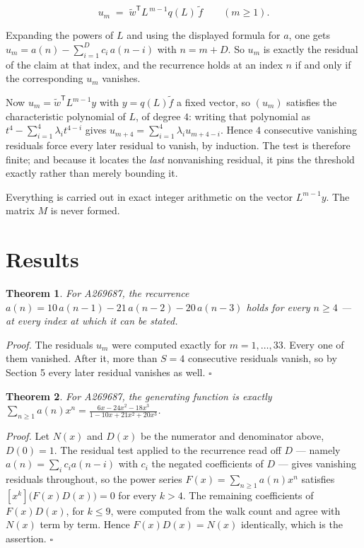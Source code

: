 \documentclass[11pt]{article}
\newtheorem{theorem}{Theorem}
\theoremstyle{definition}
\begin{document}
\[u_m \;=\; \tilde w^{\mathsf T} L^{\,m-1} q(L)\,\tilde f \qquad (m \ge 1).\]

Expanding the powers of $L$ and using the displayed formula for $a$, one gets $u_m = a(n) - \sum_{i=1}^{D} c_i\,a(n-i)$ with $n = m + D$. So $u_m$ is exactly the residual of the claim at that index, and the recurrence holds at an index $n$ if and only if the corresponding $u_m$ vanishes.

Now $u_m = \tilde w^{\mathsf T} L^{m-1} y$ with $y = q(L)\tilde f$ a fixed vector, so $(u_m)$ satisfies the characteristic polynomial of $L$, of degree $4$: writing that polynomial as $t^{4} - \sum_{i=1}^{4} \lambda_i t^{4-i}$ gives $u_{m+4} = \sum_{i=1}^{4} \lambda_i u_{m+4-i}$. Hence $4$ consecutive vanishing residuals force every later residual to vanish, by induction. The test is therefore finite; and because it locates the {\itshape last} nonvanishing residual, it pins the threshold exactly rather than merely bounding it.

Everything is carried out in exact integer arithmetic on the vector $L^{m-1}y$. The matrix $M$ is never formed.

\section{Results}

\begin{theorem} For A269687, the recurrence $a(n) = 10\,a(n-1) - 21\,a(n-2) - 20\,a(n-3)$ holds for every $n \ge 4$ --- at every index at which it can be stated.\end{theorem}

{\itshape Proof.} The residuals $u_m$ were computed exactly for $m = 1,\dots,33$. Every one of them vanished. After it, more than $S = 4$ consecutive residuals vanish, so by Section 5 every later residual vanishes as well. $\square$

\begin{theorem} For A269687, the generating function is exactly $\sum_{n\ge 1} a(n)x^n = \frac{6x - 24x^{2} - 18x^{3}}{1 - 10x + 21x^{2} + 20x^{3}}$.\end{theorem}

{\itshape Proof.} Let $N(x)$ and $D(x)$ be the numerator and denominator above, $D(0)=1$. The residual test applied to the recurrence read off $D$ --- namely $a(n) = \sum_i c_i a(n-i)$ with $c_i$ the negated coefficients of $D$ --- gives vanishing residuals throughout, so the power series $F(x)=\sum_{n\ge 1}a(n)x^n$ satisfies $[x^k]\bigl(F(x)D(x)\bigr) = 0$ for every $k > 4$. The remaining coefficients of $F(x)D(x)$, for $k \le 9$, were computed from the walk count and agree with $N(x)$ term by term. Hence $F(x)D(x) = N(x)$ identically, which is the assertion. $\square$
\end{document}
